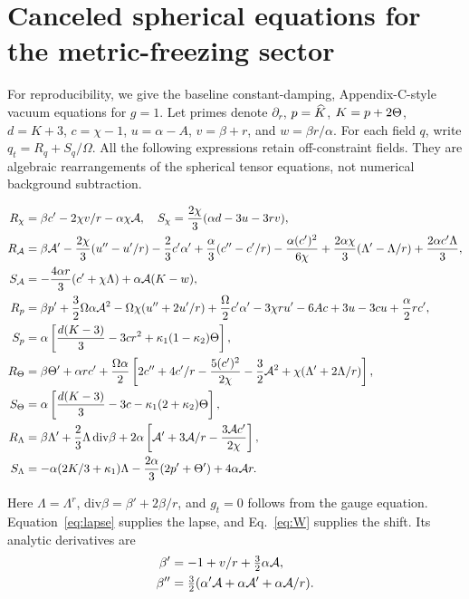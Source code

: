 \section{Canceled spherical equations for the metric-freezing sector}
\label{app:equations}
For reproducibility, we give the baseline constant-damping, Appendix-C-style vacuum equations for $g=1$. Let primes denote $\partial_r$, $p=\widehat K$, $K=p+2\Theta$, $d=K+3$, $c=\chi-1$, $u=\alpha-A$, $v=\beta+r$, and $w=\beta r/\alpha$. For each field $q$, write $q_t=R_q+S_q/\Omega$. All the following expressions retain off-constraint fields. They are algebraic rearrangements of the spherical tensor equations, not numerical background subtraction.

\begin{widetext}
\begin{align}
R_\chi &= \beta c'-2\chi v/r-\alpha\chi\mathcal A,
\quad S_\chi=\frac{2\chi}{3}(\alpha d-3u-3rv),\label{eq:fullchi}\\
R_{\mathcal A}&=\beta\mathcal A'-\frac{2\chi}{3}(u''-u'/r)-\frac23c'\alpha'
 +\frac\alpha3(c''-c'/r)-\frac{\alpha(c')^2}{6\chi}
 +\frac{2\alpha\chi}{3}(\Lambda'-\Lambda/r)+\frac{2\alpha c'\Lambda}{3},
\\ S_{\mathcal A}&=-\frac{4\alpha r}{3}(c'+\chi\Lambda)+\alpha\mathcal A(K-w),\label{eq:fullA}\\
R_p&=\beta p'+\frac32\Omega\alpha\mathcal A^2-\Omega\chi(u''+2u'/r)
 +\frac\Omega2c'\alpha'-3\chi r u'-6Ac+3u-3cu+\frac\alpha2r c',
\\ S_p&=\alpha\left[\frac{d(K-3)}3-3cr^2+\kappa_1(1-\kappa_2)\Theta\right],\label{eq:fullp}\\
R_\Theta&=\beta\Theta'+\alpha rc'+\frac{\Omega\alpha}{2}
 \left[2c''+4c'/r-\frac{5(c')^2}{2\chi}-\frac32\mathcal A^2+\chi(\Lambda'+2\Lambda/r)\right],
\\ S_\Theta&=\alpha\left[\frac{d(K-3)}3-3c-\kappa_1(2+\kappa_2)\Theta\right],\label{eq:fullT}\\
R_\Lambda&=\beta\Lambda'+\frac23\Lambda\,\mathrm{div}\beta
 +2\alpha\left[\mathcal A'+3\mathcal A/r-\frac{3\mathcal A c'}{2\chi}\right],
\\ S_\Lambda&=-\alpha(2K/3+\kappa_1)\Lambda-\frac{2\alpha}{3}(2p'+\Theta')+4\alpha\mathcal A r.
\label{eq:fullL}
\end{align}
\end{widetext}
Here $\Lambda=\Lambda^r$, $\mathrm{div}\beta=\beta'+2\beta/r$, and $g_t=0$ follows from the gauge equation. Equation~\eqref{eq:lapse} supplies the lapse, and Eq.~\eqref{eq:W} supplies the shift. Its analytic derivatives are
\begin{align}
 \beta'&=-1+v/r+\tfrac32\alpha\mathcal A,\\
 \beta''&=\tfrac32(\alpha'\mathcal A+\alpha\mathcal A'+\alpha\mathcal A/r).
\end{align}

